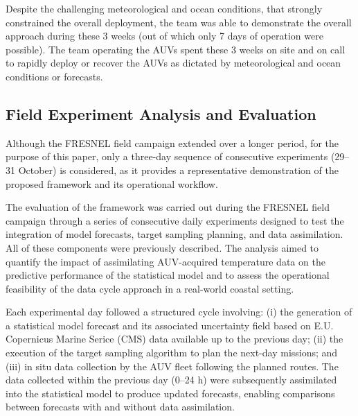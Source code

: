 Despite the challenging meteorological and ocean conditions, that
strongly constrained the overall deployment, the \proj team was able to
demonstrate the overall approach during these 3 weeks (out of which only
7 days of operation were possible). The team operating the AUVs spent
these 3 weeks on site and on call to rapidly deploy or recover the AUVs
as dictated by meteorological and ocean conditions or forecasts.



\subsection{Field Experiment Analysis and Evaluation}

Although the FRESNEL field campaign extended over a longer period, for
the purpose of this paper, only a three-day sequence of consecutive
experiments (29–31 October) is considered, as it provides a
representative demonstration of the proposed framework and its
operational workflow.

The evaluation of the framework was carried out during the FRESNEL
field campaign through a series of consecutive daily experiments
designed to test the integration of model forecasts, target sampling
planning, and data assimilation. All of these components were
previously described. The analysis aimed to quantify the impact of
assimilating AUV-acquired temperature data on the predictive
performance of the statistical model and to assess the operational
feasibility of the data cycle approach in a real-world coastal
setting.

Each experimental day followed a structured cycle involving: (i) the
generation of a statistical model forecast and its associated
uncertainty field based on E.U. Copernicus Marine Serice (CMS) \cite{sotillo2021} data available up to the previous
day; (ii) the execution of the target sampling algorithm to plan the
next-day missions; and (iii) in situ data collection by the AUV fleet
following the planned routes. The data collected within the previous
day (0–24 h) were subsequently assimilated into the statistical model
to produce updated forecasts, enabling comparisons between forecasts
with and without data assimilation.


